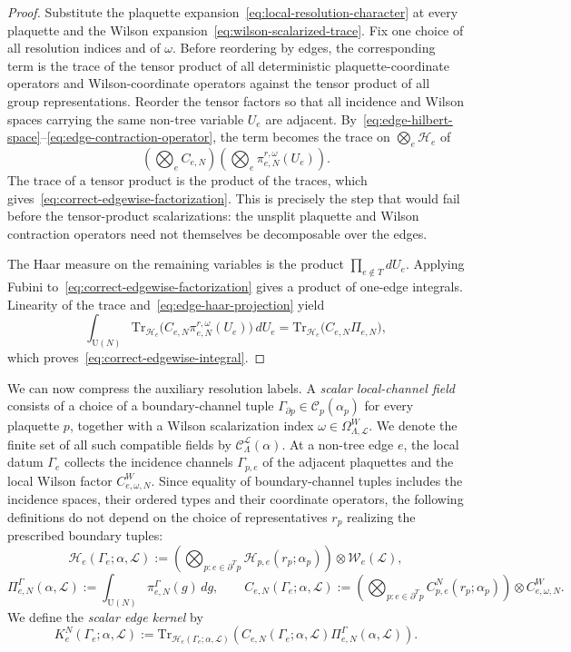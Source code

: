 \documentclass[11pt,a4paper,reqno]{article}
\theoremstyle{definition}
\theoremstyle{remark}
\newcommand\U{{\mathrm U}}
\newcommand\Tr{\mathrm{Tr}}
\newcommand\Lc{{\mathcal{L}}}
\begin{document}
\begin{proof}
Substitute the plaquette expansion~\eqref{eq:local-resolution-character} at every plaquette and the Wilson expansion~\eqref{eq:wilson-scalarized-trace}. Fix one choice of all resolution indices and of $\omega$. Before reordering by edges, the corresponding term is the trace of the tensor product of all deterministic plaquette-coordinate operators and Wilson-coordinate operators against the tensor product of all group representations. Reorder the tensor factors so that all incidence and Wilson spaces carrying the same non-tree variable $U_e$ are adjacent. By~\eqref{eq:edge-hilbert-space}--\eqref{eq:edge-contraction-operator}, the term becomes the trace on $\bigotimes_e\mathcal H_e$ of
\[
\left(\bigotimes_e C_{e,N}\right)
\left(\bigotimes_e\pi^{r,\omega}_{e,N}(U_e)\right).
\]
The trace of a tensor product is the product of the traces, which gives~\eqref{eq:correct-edgewise-factorization}. This is precisely the step that would fail before the tensor-product scalarizations: the unsplit plaquette and Wilson contraction operators need not themselves be decomposable over the edges.

The Haar measure on the remaining variables is the product $\prod_{e\notin T}dU_e$. Applying Fubini to~\eqref{eq:correct-edgewise-factorization} gives a product of one-edge integrals. Linearity of the trace and~\eqref{eq:edge-haar-projection} yield
\[
\int_{\U(N)}
\Tr_{\mathcal H_e}\bigl(C_{e,N}\pi^{r,\omega}_{e,N}(U_e)\bigr)\,dU_e
=
\Tr_{\mathcal H_e}\bigl(C_{e,N}\Pi_{e,N}\bigr),
\]
which proves~\eqref{eq:correct-edgewise-integral}.
\end{proof}

We can now compress the auxiliary resolution labels. A \emph{scalar local-channel field} consists of a choice of a boundary-channel tuple $\Gamma_{\partial p}\in\mathcal C_p(\alpha_p)$ for every plaquette $p$, together with a Wilson scalarization index $\omega\in\Omega^W_{\Lambda,\Lc}$. We denote the finite set of all such compatible fields by $\mathcal C^\Lc_\Lambda(\alpha)$. At a non-tree edge $e$, the local datum $\Gamma_e$ collects the incidence channels $\Gamma_{p,e}$ of the adjacent plaquettes and the local Wilson factor $C^W_{e,\omega,N}$. Since equality of boundary-channel tuples includes the incidence spaces, their ordered types and their coordinate operators, the following definitions do not depend on the choice of representatives $r_p$ realizing the prescribed boundary tuples:
\[
\mathcal H_e(\Gamma_e;\alpha,\Lc)
:=\left(\bigotimes_{p:e\in\partial^Tp}\mathcal H_{p,e}(r_p;\alpha_p)\right)
\otimes\mathcal W_e(\Lc),
\]
\[
\Pi^\Gamma_{e,N}(\alpha,\Lc)
:=\int_{\U(N)}\pi^\Gamma_{e,N}(g)\,dg,
\qquad
C_{e,N}(\Gamma_e;\alpha,\Lc)
:=\left(\bigotimes_{p:e\in\partial^Tp}C^N_{p,e}(r_p;\alpha_p)\right)
\otimes C^W_{e,\omega,N}.
\]
We define the \emph{scalar edge kernel} by
\begin{equation}\label{eq:projection-edge-kernel}
K_e^N(\Gamma_e;\alpha,\Lc)
:=\Tr_{\mathcal H_e(\Gamma_e;\alpha,\Lc)}\!\left(
C_{e,N}(\Gamma_e;\alpha,\Lc)\Pi^\Gamma_{e,N}(\alpha,\Lc)
\right).
\end{equation}
\end{document}
